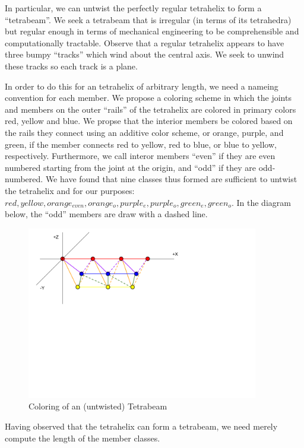 \documentclass[11pt]{article}
\begin{document}
In particular, we can untwist the perfectly regular tetrahelix to form a ``tetrabeam''. We seek a tetrabeam that is irregular
(in terms of its tetrahedra) but regular enough in terms of mechanical engineering to be comprehensible and computationally tractable.
Observe that a regular tetrahelix appears to have three bumpy ``tracks'' which wind about the central axis.  We seek to unwind
these tracks so each track is a plane.

In order to do this for an tetrahelix of arbitrary length, we need a nameing convention for each member. We propose a coloring
scheme in which the joints and members on the outer ``rails'' of the tetrahelix are colored in primary colors red, yellow and blue.
We propse that the interior members be colored based on the rails they connect using an additive color scheme, or orange, purple, and green,
if the member connects red to yellow, red to blue, or blue to yellow, respectively.  Furthermore, we call interor members ``even'' if they
are even numbered starting from the joint at the origin, and ``odd'' if they are odd-numbered.  We have found that nine classes thus
formed are sufficient to untwist the tetrahelix and for our purposes: $red, yellow, orange_{even}, orange_o, purple_e, purple_o, green_e, green_o$. In the diagram below, the ``odd'' members are draw with a dashed line.


 \begin{figure}[H]
     \centering
     \includegraphics[width=0.9\textwidth]{TetrahelixColoringDiagram.png}
     \caption{Coloring of an (untwisted) Tetrabeam}
 \end{figure}

 Having observed that the tetrahelix can form a tetrabeam, we need merely compute the length of the member classes.
\end{document}
